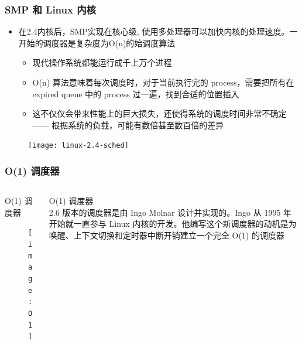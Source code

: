 \begin{frame}
	\frametitle{SMP 和 Linux 内核}
	
	\begin{itemize}
		
		\item 在2.4内核后，SMP实现在核心级, 使用多处理器可以加快内核的处理速度。一开始的调度器是复杂度为O(n)的始调度算法
		
		\begin{itemize}
			\item 现代操作系统都能运行成千上万个进程
			\item O(n) 算法意味着每次调度时，对于当前执行完的 process，需要把所有在 expired queue 中的 process 过一遍，找到合适的位置插入
			\item 这不仅仅会带来性能上的巨大损失，还使得系统的调度时间非常不确定 —— 根据系统的负载，可能有数倍甚至数百倍的差异
		\end{itemize}
	\end{itemize}
	
    \begin{figure}
    \texttt{[image: linux-2.4-sched]}
    \end{figure}
	
	
\end{frame}
\begin{frame}
	\frametitle{ O(1) 调度器}
	\begin{columns}
		\begin{column}{.5\textwidth}
			\Large \centering
			O(1) 调度器
            \begin{figure}
    			\texttt{[image: O1]}
            \end{figure}
	
		\end{column}
		
		\begin{column}{.5\textwidth}
			\large
			O(1) 调度器 \\
			
2.6 版本的调度器是由 Ingo Molnar 设计并实现的。Ingo 从 1995 年开始就一直参与 Linux 内核的开发。他编写这个新调度器的动机是为唤醒、上下文切换和定时器中断开销建立一个完全 O(1) 的调度器
			
		\end{column}
	\end{columns}
\end{frame}


